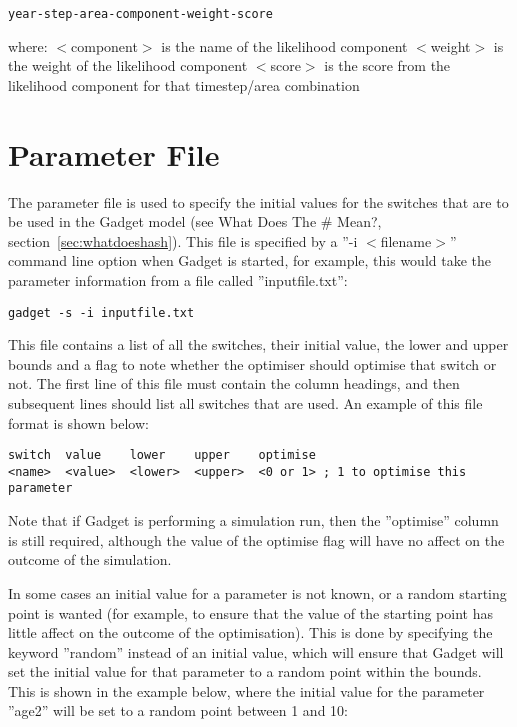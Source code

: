 \documentclass[10pt,twoside]{book}
\begin{document}
{\small\begin{verbatim}
year-step-area-component-weight-score
\end{verbatim}}

where:\newline
$<$component$>$ is the name of the likelihood component\newline
$<$weight$>$ is the weight of the likelihood component\newline
$<$score$>$ is the score from the likelihood component for that timestep/area combination

\chapter{Parameter File}\label{chap:param}
The parameter file is used to specify the initial values for the switches that are to be used in the Gadget model (see What Does The \# Mean?, section~\ref{sec:whatdoeshash}).  This file is specified by a ''-i $<$filename$>$'' command line option when Gadget is started, for example, this would take the parameter information from a file called ''inputfile.txt'':

{\small\begin{verbatim}
gadget -s -i inputfile.txt
\end{verbatim}}

This file contains a list of all the switches, their initial value, the lower and upper bounds and a flag to note whether the optimiser should optimise that switch or not.  The first line of this file must contain the column headings, and then subsequent lines should list all switches that are used.  An example of this file format is shown below:

{\small\begin{verbatim}
switch  value    lower    upper    optimise
<name>  <value>  <lower>  <upper>  <0 or 1> ; 1 to optimise this parameter
\end{verbatim}}

Note that if Gadget is performing a simulation run, then the ''optimise'' column is still required, although the value of the optimise flag will have no affect on the outcome of the simulation.

\bigskip
In some cases an initial value for a parameter is not known, or a random starting point is wanted (for example, to ensure that the value of the starting point has little affect on the outcome of the optimisation).  This is done by specifying the keyword ''random'' instead of an initial value, which will ensure that Gadget will set the initial value for that parameter to a random point within the bounds.  This is shown in the example below, where the initial value for the parameter ''age2'' will be set to a random point between 1 and 10:
\end{document}

